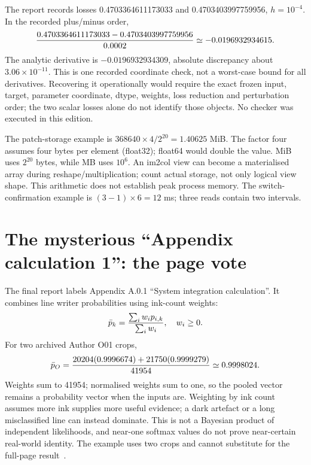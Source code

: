 The report records losses 0.4703364611173033 and 0.4703403997759956,
$h=10^{-4}$. In the recorded plus/minus order,
\[
{0.4703364611173033-0.4703403997759956\over0.0002}
\simeq-0.0196932934615.
\]
The analytic derivative is $-0.0196932934309$, absolute discrepancy
about $3.06\times10^{-11}$. This is one recorded coordinate check,
not a worst-case bound for all derivatives. Recovering it operationally
would require the exact frozen input, target, parameter coordinate, dtype,
weights, loss reduction and perturbation order; the two scalar losses alone
do not identify those objects. No checker was executed in this edition.

The patch-storage example is $368640\times4/2^{20}=1.40625$ MiB.
The factor four assumes four bytes per element (float32); float64 would
double the value. MiB uses $2^{20}$ bytes, while MB uses $10^6$.
An im2col view can become a materialised array during reshape/multiplication;
count actual storage, not only logical view shape. This arithmetic does not
establish peak process memory. The switch-confirmation example is
$(3-1)\times6=12$ ms; three reads contain two intervals.

\section{The mysterious ``Appendix calculation 1'': the page vote}
The final report labels Appendix A.0.1 ``System integration calculation''.
It combines line writer probabilities using ink-count weights:
\[
\bar p_k={\sum_i w_i p_{i,k}\over\sum_i w_i},\quad w_i\ge0.
\]
For two archived Author O01 crops,
\[
\bar p_O={20204(0.9996674)+21750(0.9999279)\over41954}
\simeq0.9998024.
\]
Weights sum to 41954; normalised weights sum to one, so the pooled vector
remains a probability vector when the inputs are. Weighting by ink count
assumes more ink supplies more useful evidence; a dark artefact or a long
misclassified line can instead dominate. This is not a Bayesian product
of independent likelihoods, and near-one softmax values do not prove
near-certain real-world identity. The example uses two crops and cannot
substitute for the full-page result~\cite{finalreport2026}.

